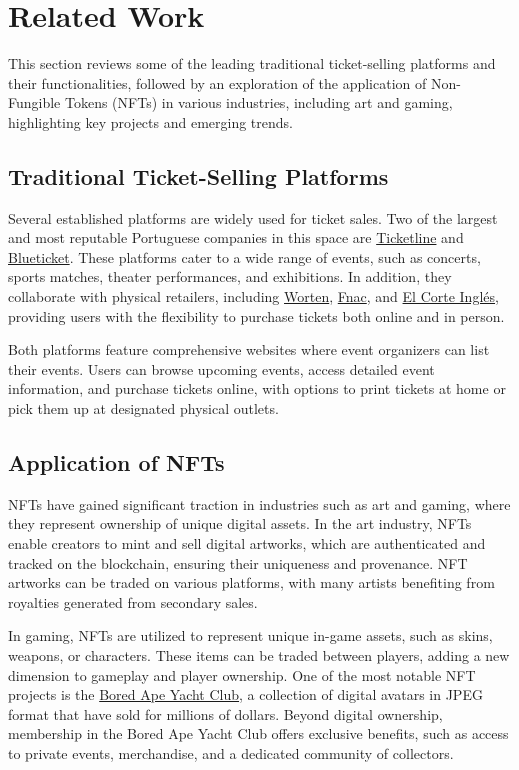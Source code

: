 \section{Related Work}
\label{sec:related_work}

This section reviews some of the leading traditional ticket-selling platforms
and their functionalities, followed by an exploration of the application of
Non-Fungible Tokens (NFTs) in various industries, including art and gaming,
highlighting key projects and emerging trends.

\subsection{Traditional Ticket-Selling Platforms}
\label{subsec:traditional_ticket_selling_platforms}

Several established platforms are widely used for ticket sales. Two of the
largest and most reputable Portuguese companies in this space are
\href{https://ticketline.sapo.pt/}{Ticketline} and
\href{https://blueticket.meo.pt/}{Blueticket}. These platforms cater to a wide
range of events, such as concerts, sports matches, theater performances, and
exhibitions. In addition, they collaborate with physical retailers, including
\href{https://www.worten.pt/}{Worten}, \href{https://www.fnac.pt/}{Fnac}, and
\href{https://www.elcorteingles.pt/}{El Corte Inglés}, providing users with the
flexibility to purchase tickets both online and in person.

Both platforms feature comprehensive websites where event organizers can list
their events. Users can browse upcoming events, access detailed event
information, and purchase tickets online, with options to print tickets at home
or pick them up at designated physical outlets.


\subsection{Application of NFTs}
\label{subsec:application_of_nfts}

NFTs have gained significant traction in industries such as art and gaming,
where they represent ownership of unique digital assets. In the art industry,
NFTs enable creators to mint and sell digital artworks, which are authenticated
and tracked on the blockchain, ensuring their uniqueness and provenance. NFT
artworks can be traded on various platforms, with many artists benefiting from
royalties generated from secondary sales.

In gaming, NFTs are utilized to represent unique in-game assets, such as skins,
weapons, or characters. These items can be traded between players, adding a new
dimension to gameplay and player ownership. One of the most notable NFT
projects is the \href{https://www.boredapeyachtclub.com/}{Bored Ape Yacht
    Club}, a collection of digital avatars in JPEG format that have sold for
millions of dollars. Beyond digital ownership, membership in the Bored Ape
Yacht Club offers exclusive benefits, such as access to private events,
merchandise, and a dedicated community of collectors.
